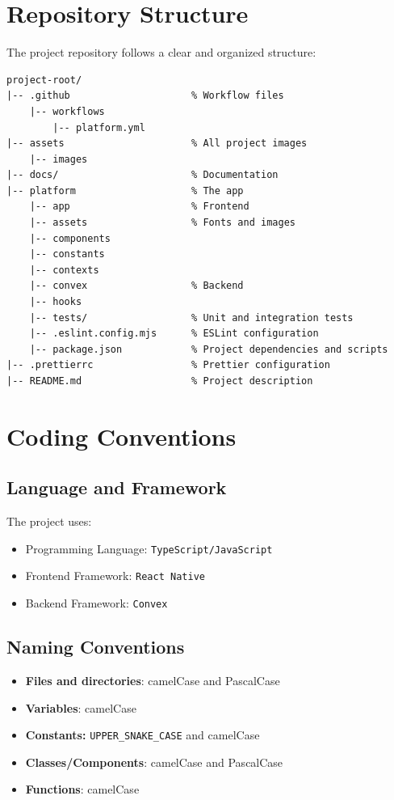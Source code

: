 \documentclass[a4paper,12pt]{article}
\begin{document}
\section{Repository Structure}
The project repository follows a clear and organized structure:

\begin{verbatim}
project-root/
|-- .github                     % Workflow files
    |-- workflows
        |-- platform.yml
|-- assets                      % All project images
    |-- images
|-- docs/                       % Documentation
|-- platform                    % The app
    |-- app                     % Frontend
    |-- assets                  % Fonts and images
    |-- components
    |-- constants
    |-- contexts
    |-- convex                  % Backend
    |-- hooks
    |-- tests/                  % Unit and integration tests
    |-- .eslint.config.mjs      % ESLint configuration
    |-- package.json            % Project dependencies and scripts
|-- .prettierrc                 % Prettier configuration
|-- README.md                   % Project description
\end{verbatim}

\section{Coding Conventions}

\subsection{Language and Framework}
The project uses:
\begin{itemize}
\item Programming Language: \texttt{TypeScript/JavaScript}
\item Frontend Framework: \texttt{React Native}
\item Backend Framework: \texttt{Convex}
\end{itemize}

\subsection{Naming Conventions}
\begin{itemize}
\item \textbf{Files and directories}: camelCase and PascalCase
\item \textbf{Variables}: camelCase
\item \textbf{Constants:} \texttt{UPPER\_SNAKE\_CASE} and camelCase
\item \textbf{Classes/Components}: camelCase and PascalCase
\item \textbf{Functions}: camelCase
\end{itemize}
\end{document}
